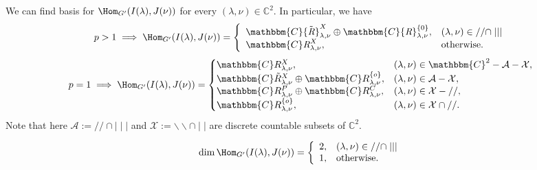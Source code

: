 \documentclass[pdf]{beamer}
\newcommand{\OpR}{\mbox{\it R}}
\theoremstyle{mystyle}
\theoremstyle{remark}
\begin{document}
\begin{frame}
	\begin{theorem}
		We can find basis for $\Hom_{G'}(I(\lambda),J(\nu))$ for every $(\lambda,\nu)\in \mathbb{C}^2$. In particular, we have
		\vspace{-1.4em}
		\newcommand{\SBO}{\Hom_{G'}(I(\lambda),J(\nu))}
		\begin{equation*}
	  p
	  >1\implies\SBO= \left\{
    \begin{array}{ll}
	    \mathbbm{C} {\tilde{\OpR}}_{\lambda, \nu}^{X} \oplus \mathbbm{C}
      {\OpR}^{\{ 0 \}}_{\lambda, \nu}, & (\lambda, \nu) \in / /\cap 
      \mid\mid\mid \\
      \mathbbm{C} \OpR^X_{\lambda, \nu}, &
      \mbox{\normalfont otherwise.}
    \end{array} \right. 
    \vspace{-0.9em}
  \end{equation*}
		\begin{equation*}
p=1\implies 
			\SBO = \left\{
	\begin{array}{@{}ll@{}}
		\mathbbm{C}R^X_{\lambda, \nu}, & (\lambda, \nu) \in \mathbbm{C}^2 - \mathcal{A} - \mathcal{X},\\
     \mathbbm{C} \tilde{R}^X_{\lambda, \nu} \oplus \mathbbm{C}R^{\{ o
     \}}_{\lambda, \nu}, & (\lambda, \nu) \in \mathcal{A} -
     \mathcal{X},\\
     \mathbbm{C}R^P_{\lambda, \nu} \oplus \mathbbm{C}R^C_{\lambda, \nu}, &
     (\lambda, \nu) \in \mathcal{X} - / /,\\
     \mathbbm{C}R^{\{ o \}}_{\lambda, \nu}, & (\lambda, \nu) \in \mathcal{X} \cap / /.
   \end{array} \right.
   \end{equation*}
   Note that here $\mathcal{A}:=//\cap \mid\mid\mid$ and $\mathcal{X}:=\backslash\backslash\cap\mid\mid$ are discrete countable subsets of $\mathbb{C}^2$.
		\label{}
	\end{theorem}
	\begin{corollary}
		\begin{equation*}
	  \dim\Hom_{G'}(I(\lambda),J(\nu))= \left\{
    \begin{array}{ll}
	    2, & (\lambda, \nu) \in / /\cap 
      \mid\mid\mid \\
      1, &
      \mbox{\normalfont otherwise.}
    \end{array} \right. 
  \end{equation*}
	\end{corollary}
\end{frame}
\end{document}
